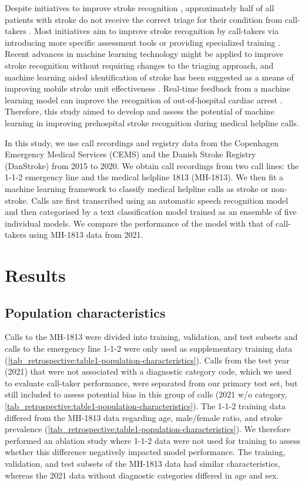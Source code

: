 {Despite initiatives to improve stroke recognition \parencite{cite8,cite9}, approximately half of all patients with stroke do not receive the correct triage for their condition from call-takers \parencite{cite10,cite11,cite12}. Most initiatives aim to improve stroke recognition by call-takers via introducing more specific assessment tools \parencite{cite8,cite9} or providing specialized training \parencite{cite13}. Recent advances in machine learning technology might be applied to improve stroke recognition without requiring changes to the triaging approach, and machine learning aided identification of stroke has been suggested as a means of improving mobile stroke unit effectiveness \parencite{cite7}. Real-time feedback from a machine learning model can improve the recognition of out-of-hospital cardiac arrest \parencite{cite14,cite15}. Therefore, this study aimed to develop and assess the potential of machine learning in improving prehospital stroke recognition during medical helpline calls. 

In this study, we use call recordings and registry data from the Copenhagen Emergency Medical Services (CEMS) and the Danish Stroke Registry (DanStroke) \parencite{cite16} from 2015 to 2020. We obtain call recordings from two call lines: the 1-1-2 emergency line and the medical helpline 1813 (MH-1813). We then fit a machine learning framework to classify medical helpline calls as stroke or non-stroke. Calls are first transcribed using an automatic speech recognition model and then categorised by a text classification model trained as an ensemble of five individual models. We compare the performance of the model with that of call-takers using MH-1813 data from 2021.


\section{Results}

\subsection{Population characteristics}
%
Calls to the MH-1813 were divided into training, validation, and test subsets and calls to the emergency line 1-1-2 were only used as supplementary training data (\cref{tab_retrospective:table1-population-characteristics}). Calls from the test year (2021) that were not associated with a diagnostic category code, which we used to evaluate call-taker performance, were separated from our primary test set, but still included to assess potential bias in this group of calls (2021 w/o category, \cref{tab_retrospective:table1-population-characteristics}).  The 1-1-2 training data differed from the MH-1813 data regarding age, male/female ratio, and stroke prevalence (\cref{tab_retrospective:table1-population-characteristics}). We therefore performed an ablation study where 1-1-2 data were not used for training to assess whether this difference negatively impacted model performance. The training, validation, and test subsets of the MH-1813 data had similar characteristics, whereas the 2021 data without diagnostic categories differed in age and sex.

}
